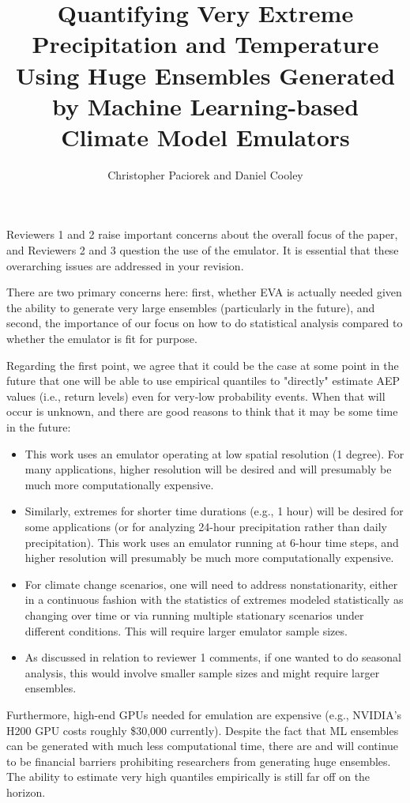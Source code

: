 \documentclass[12pt,english]{reviewresponse}
\title{Quantifying Very Extreme Precipitation and Temperature Using Huge Ensembles Generated by Machine Learning-based Climate Model Emulators}
\author{Christopher Paciorek and Daniel Cooley}
\begin{document}
\maketitle


\editor
\begin{generalcomment}
	Reviewers 1 and 2 raise important concerns about the overall focus of the paper, and Reviewers 2 and 3 question the use of the emulator. It is essential that these overarching issues are addressed in your revision.
\end{generalcomment}
\begin{revresponse}

There are two primary concerns here: first, whether EVA is actually needed given the ability to generate very large ensembles (particularly in the future), and second, the importance of our focus on how to do statistical analysis compared to whether the emulator is fit for purpose.

Regarding the first point, we agree that it could be 
the case at some point in the future that one will be able to use empirical quantiles to "directly" estimate AEP values (i.e., return levels) even for very-low probability events. When that will occur is unknown, and there are good reasons to think that it may be some time in the future:
\begin{itemize}
    \item This work uses an emulator operating at low spatial resolution (1 degree). For many applications, higher resolution will be desired and will presumably be much more computationally expensive.
\item Similarly, extremes for shorter time durations (e.g., 1 hour) will be desired for some applications (or for analyzing 24-hour precipitation rather than daily precipitation). This work uses an emulator running at 6-hour time steps, and higher resolution will presumably be much more computationally expensive.
\item For climate change scenarios, one will need to address nonstationarity, either in a continuous fashion with the statistics of extremes modeled statistically as changing over time or via running multiple stationary scenarios under different conditions. This will require larger emulator sample sizes. 
\item As discussed in relation to reviewer 1 comments, if one wanted to do seasonal analysis, this would involve smaller sample sizes and might require larger ensembles.
\end{itemize}
Furthermore, high-end GPUs needed for emulation are expensive (e.g., NVIDIA's H200 GPU costs roughly \$30,000 currently). Despite the fact that ML ensembles can be generated with much less computational time, there are and will continue to be financial barriers prohibiting researchers from generating huge ensembles.  
The ability to estimate very high quantiles empirically is still far off on the horizon.


\end{revresponse}
\end{document}
